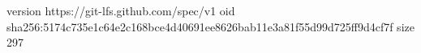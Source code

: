 version https://git-lfs.github.com/spec/v1
oid sha256:5174c735e1c64e2c168bce4d40691ee8626bab11e3a81f55d99d725ff9d4cf7f
size 297
